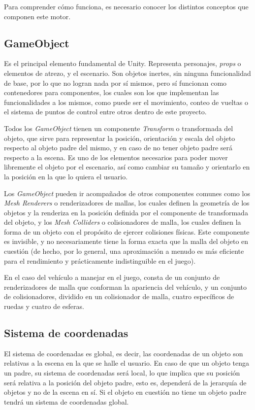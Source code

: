 Para comprender cómo funciona, es necesario conocer los distintos conceptos que componen este motor.

\subsection{GameObject}

Es el principal elemento fundamental de Unity. Representa personajes, \textit{props} o elementos de atrezo, y el escenario. Son objetos inertes, sin ninguna funcionalidad de base, por lo que no logran nada por sí mismos, pero sí funcionan como contenedores para componentes, los cuales son los que implementan las funcionalidades a los mismos, como puede ser el movimiento, conteo de vueltas o el sistema de puntos de control entre otros dentro de este proyecto.

Todos los \textit{GameObject} tienen un componente \textit{Transform} o transformada del objeto, que sirve para representar la posición, orientación y escala del objeto respecto al objeto padre del mismo, y en caso de no tener objeto padre será respecto a la escena. Es uno de los elementos necesarios para poder mover libremente el objeto por el escenario, así como cambiar su tamaño y orientarlo en la posición en la que lo quiera el usuario.

Los \textit{GameObject} pueden ir acompañados de otros componentes comunes como los \textit{Mesh Renderers} o renderizadores de mallas, los cuales definen la geometría de los objetos y la renderiza en la posición definida por el componente de transformada del objeto, y los \textit{Mesh Colliders} o colisionadores de malla, los cuales definen la forma de un objeto con el propósito de ejercer colisiones físicas. Este componente es invisible, y no necesariamente tiene la forma exacta que la malla del objeto en cuestión (de hecho, por lo general, una aproximación a menudo es más eficiente para el rendimiento y prácticamente indistinguible en el juego).

En el caso del vehículo a manejar en el juego, consta de un conjunto de renderizadores de malla que conforman la apariencia del vehículo, y un conjunto de colisionadores, dividido en un colisionador de malla, cuatro específicos de ruedas y cuatro de esferas.

\subsection{Sistema de coordenadas}

El sistema de coordenadas es global, es decir, las coordenadas de un objeto son relativas a la escena en la que se halle el usuario. En caso de que un objeto tenga un padre, su sistema de coordenadas será local, lo que implica que su posición será relativa a la posición del objeto padre, esto es, dependerá de la jerarquía de objetos y no de la escena en sí. Si el objeto en cuestión no tiene un objeto padre tendrá un sistema de coordenadas global.

